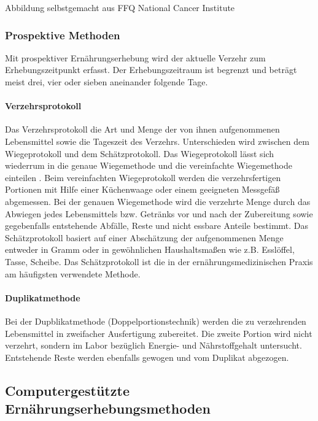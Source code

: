 Abbildung selbstgemacht aus FFQ National Cancer Institute

\subsubsection{Prospektive Methoden}

Mit  prospektiver Ernährungserhebung wird der aktuelle Verzehr zum Erhebungszeitpunkt erfasst. Der Erhebungszeitraum ist begrenzt und beträgt meist drei, vier oder sieben aneinander folgende Tage. 

\paragraph{Verzehrsprotokoll}

Das Verzehrsprotokoll die Art und Menge der von ihnen aufgenommenen Lebensmittel sowie die Tageszeit des Verzehrs. Unterschieden wird zwischen dem Wiegeprotokoll und dem Schätzprotokoll. 
Das Wiegeprotokoll lässt sich wiederrum in die genaue Wiegemethode und die vereinfachte Wiegemethode einteilen \cite{sichert1984ernaehrungs}. Beim vereinfachten Wiegeprotokoll werden die verzehrsfertigen Portionen mit Hilfe einer Küchenwaage oder einem geeigneten Messgefäß abgemessen. Bei der genauen Wiegemethode wird die verzehrte Menge durch das Abwiegen jedes Lebensmittels bzw. Getränks vor und nach der Zubereitung sowie gegebenfalls entstehende Abfälle, Reste und nicht essbare Anteile bestimmt. \cite{PHN:587344} Das Schätzprotokoll basiert auf einer Abschätzung der aufgenommenen Menge entweder in Gramm oder in gewöhnlichen Haushaltsmaßen wie z.B. Esslöffel, Tasse, Scheibe.
Das Schätzprotokoll ist die in der ernährungsmedizinischen Praxis am häufigsten verwendete Methode. \cite{muller2007ernahrungsmedizinische}


\paragraph{Duplikatmethode}

Bei der Dupblikatmethode (Doppelportionstechnik) werden die zu verzehrenden Lebensmittel in zweifacher Ausfertigung zubereitet. Die zweite Portion wird nicht verzehrt, sondern im Labor bezüglich Energie- und Nährstoffgehalt untersucht. Entstehende Reste werden ebenfalls gewogen und vom Duplikat abgezogen. \cite{MethodenderErnaehrungs}

\newpage

\subsection{Computergestützte Ernährungserhebungsmethoden}

